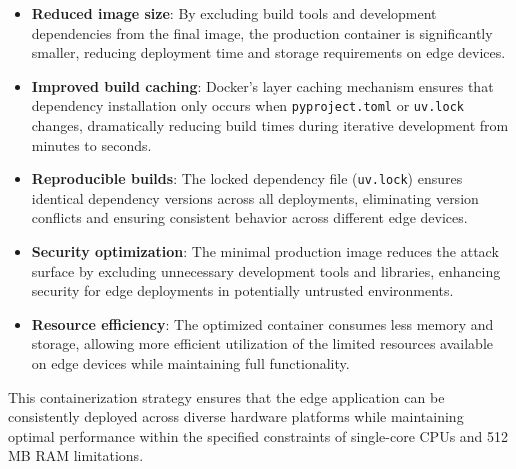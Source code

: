 \begin{itemize}
    \item \textbf{Reduced image size}: By excluding build tools and development dependencies from the final image, the production container is significantly smaller, reducing deployment time and storage requirements on edge devices.
    
    \item \textbf{Improved build caching}: Docker's layer caching mechanism ensures that dependency installation only occurs when \texttt{pyproject.toml} or \texttt{uv.lock} changes, dramatically reducing build times during iterative development from minutes to seconds.
    
    \item \textbf{Reproducible builds}: The locked dependency file (\texttt{uv.lock}) ensures identical dependency versions across all deployments, eliminating version conflicts and ensuring consistent behavior across different edge devices.
    
    \item \textbf{Security optimization}: The minimal production image reduces the attack surface by excluding unnecessary development tools and libraries, enhancing security for edge deployments in potentially untrusted environments.
    
    \item \textbf{Resource efficiency}: The optimized container consumes less memory and storage, allowing more efficient utilization of the limited resources available on edge devices while maintaining full functionality.
\end{itemize}

This containerization strategy ensures that the edge application can be consistently deployed across diverse hardware platforms while maintaining optimal performance within the specified constraints of single-core CPUs and 512 MB RAM limitations.

